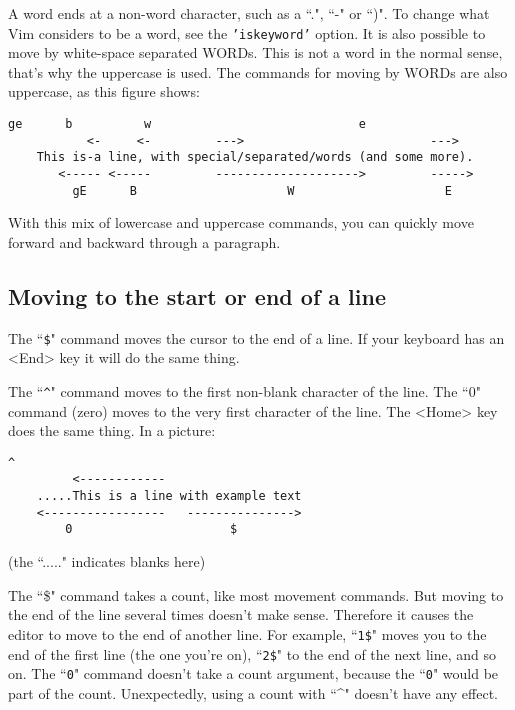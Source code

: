 A word ends at a non-word character, such as a ``.", ``-" or ``)".
To change what Vim considers to be a word, see the \texttt{'iskeyword'} option.
It is also possible to move by white-space separated WORDs.
This is not a word in the normal sense, that's why the uppercase is used.
The commands for moving by WORDs are also uppercase, as this figure shows:

\begin{Verbatim}[samepage=true]
           ge      b          w                             e
           <-     <-         --->                          --->
    This is-a line, with special/separated/words (and some more).
       <----- <-----         -------------------->         ----->
         gE      B                     W                     E
\end{Verbatim}

With this mix of lowercase and uppercase commands, you can quickly move forward and backward through a paragraph.

\subsection{Moving to the start or end of a line}

The ``\texttt{\$}" command moves the cursor to the end of a line.
If your keyboard has an <End> key it will do the same thing.

The ``\texttt{\^{}}" command moves to the first non-blank character of the line.
The ``0" command (zero) moves to the very first character of the line.
The <Home> key does the same thing.
In a picture:

\begin{Verbatim}[samepage=true]
               ^
         <------------
    .....This is a line with example text
    <-----------------   --------------->
        0                      $
\end{Verbatim}

(the ``....." indicates blanks here)

The ``\$" command takes a count, like most movement commands.
But moving to the end of the line several times doesn't make sense.
Therefore it causes the editor to move to the end of another line.
For example, ``\texttt{1\$}" moves you to the end of the first line (the one you're on), ``\texttt{2\$}" to the end of the next line, and so on.
The ``\texttt{0}" command doesn't take a count argument, because the ``\texttt{0}" would be part of the count.
Unexpectedly, using a count with ``\textasciicircum" doesn't have any effect.

